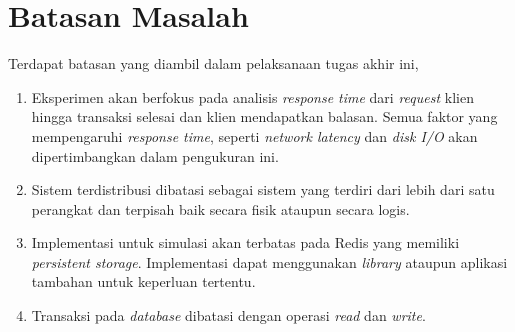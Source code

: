 \section{Batasan Masalah}

Terdapat batasan yang diambil dalam pelaksanaan tugas akhir ini,

\begin{enumerate}
    \item Eksperimen akan berfokus pada analisis \textit{response time} dari \textit{request} klien hingga transaksi selesai dan klien mendapatkan balasan. Semua faktor yang mempengaruhi \textit{response time}, seperti \textit{network latency} dan \textit{disk I/O} akan dipertimbangkan dalam pengukuran ini.
    \item Sistem terdistribusi dibatasi sebagai sistem yang terdiri dari lebih dari satu perangkat dan terpisah baik secara fisik ataupun secara logis.
    \item Implementasi untuk simulasi akan terbatas pada Redis yang memiliki \textit{persistent storage}. Implementasi dapat menggunakan \textit{library} ataupun aplikasi tambahan untuk keperluan tertentu.
    \item Transaksi pada \textit{database} dibatasi dengan operasi \textit{read} dan \textit{write}.
\end{enumerate}
